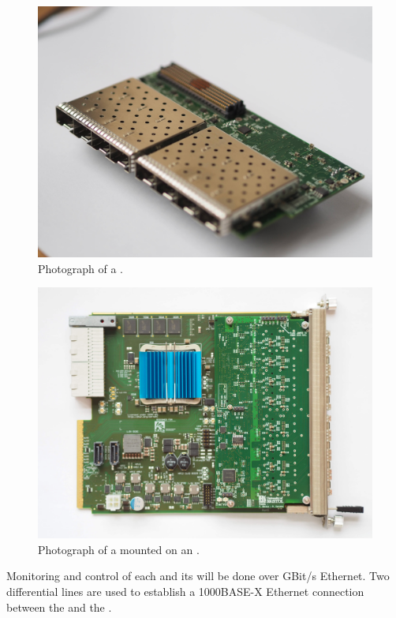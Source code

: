 \documentclass{dune}
\begin{document}
\begin{figure}[h]
\includegraphics[width=\textwidth]{P7230005.jpg}
\caption{Photograph of a .}
\label{fig:fib_photo}
\end{figure}

\begin{figure}[h]
\includegraphics[width=\textwidth]{OI000293.jpg}
\caption{Photograph of a  mounted on an .}
\label{fig:fib_afc_photo}
\end{figure}

Monitoring and control of each  and its  will be done over GBit/s Ethernet. Two differential lines are used to establish a 1000BASE-X Ethernet connection between the  and the .
\end{document}
